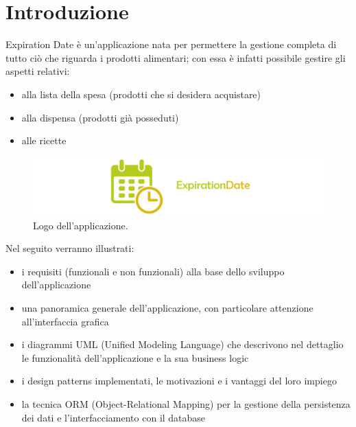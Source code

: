 \chapter{Introduzione}

Expiration Date è un'applicazione nata per permettere la gestione completa di tutto ciò che riguarda i prodotti alimentari; con essa è infatti possibile gestire gli aspetti relativi:
\begin{itemize}
  \item alla lista della spesa (prodotti che si desidera acquistare)
  \item alla dispensa (prodotti già posseduti)
  \item alle ricette
\end{itemize}

\begin{figure}[H]
  \includegraphics[width=\linewidth]{images/app-logo.png}
  \caption{Logo dell'applicazione.}
  \label{fig:applogo}
\end{figure}

Nel seguito verranno illustrati:
\begin{itemize}
\item i requisiti (funzionali e non funzionali) alla base dello sviluppo dell'applicazione
\item una panoramica generale dell'applicazione, con particolare attenzione all'interfaccia grafica
\item i diagrammi UML (Unified Modeling Language) che descrivono nel dettaglio le funzionalità dell'applicazione e la sua business logic
\item i design patterns implementati, le motivazioni e i vantaggi del loro impiego
\item la tecnica ORM (Object-Relational Mapping) per la gestione della persistenza dei dati e l'interfacciamento con il database
\end{itemize}